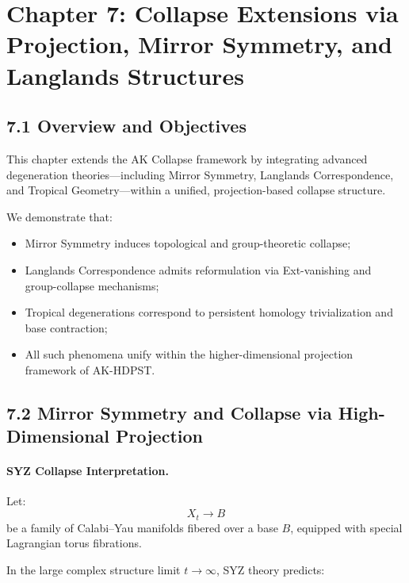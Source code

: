 \documentclass[11pt]{article}
\begin{document}
\section{Chapter 7: Collapse Extensions via Projection, Mirror Symmetry, and Langlands Structures}

\subsection*{7.1 Overview and Objectives}

This chapter extends the AK Collapse framework by integrating advanced degeneration theories—including Mirror Symmetry, Langlands Correspondence, and Tropical Geometry—within a unified, projection-based collapse structure.

We demonstrate that:

\begin{itemize}
    \item Mirror Symmetry induces topological and group-theoretic collapse;
    \item Langlands Correspondence admits reformulation via Ext-vanishing and group-collapse mechanisms;
    \item Tropical degenerations correspond to persistent homology trivialization and base contraction;
    \item All such phenomena unify within the higher-dimensional projection framework of AK-HDPST.
\end{itemize}

\subsection*{7.2 Mirror Symmetry and Collapse via High-Dimensional Projection}

\paragraph{SYZ Collapse Interpretation.}
Let:
\[
X_t \longrightarrow B
\]
be a family of Calabi–Yau manifolds fibered over a base \( B \), equipped with special Lagrangian torus fibrations.

In the large complex structure limit \( t \to \infty \), SYZ theory predicts:
\end{document}

